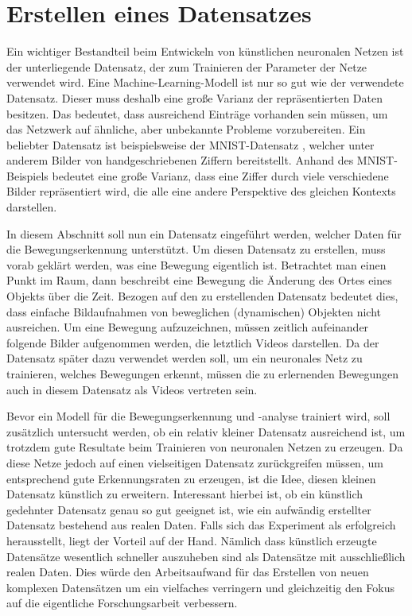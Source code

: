 \chapter{Erstellen eines Datensatzes}\label{chapter:dataset}
Ein wichtiger Bestandteil beim Entwickeln von künstlichen neuronalen Netzen ist
der unterliegende Datensatz, der zum Trainieren der Parameter der Netze
verwendet wird. Eine Machine-Learning-Modell ist nur so gut wie der verwendete
Datensatz. Dieser muss deshalb eine große Varianz der repräsentierten Daten
besitzen. Das bedeutet, dass ausreichend Einträge vorhanden sein müssen, um das
Netzwerk auf ähnliche, aber unbekannte Probleme vorzubereiten. Ein beliebter
Datensatz ist beispielsweise der MNIST-Datensatz \cite{6296535}, welcher unter
anderem Bilder von handgeschriebenen Ziffern bereitstellt. Anhand des
MNIST-Beispiels bedeutet eine große Varianz, dass eine Ziffer durch viele
verschiedene Bilder repräsentiert wird, die alle eine andere Perspektive des
gleichen Kontexts darstellen.

In diesem Abschnitt soll nun ein Datensatz eingeführt werden, welcher Daten für
die Bewegungserkennung unterstützt. Um diesen Datensatz zu erstellen, muss vorab
geklärt werden, was eine Bewegung eigentlich ist. Betrachtet man einen Punkt im
Raum, dann beschreibt eine Bewegung die Änderung des Ortes eines Objekts über
die Zeit. Bezogen auf den zu erstellenden Datensatz bedeutet dies, dass einfache
Bildaufnahmen von beweglichen (dynamischen) Objekten nicht ausreichen. Um eine
Bewegung aufzuzeichnen, müssen zeitlich aufeinander folgende Bilder aufgenommen
werden, die letztlich Videos darstellen. Da der Datensatz später dazu verwendet
werden soll, um ein neuronales Netz zu trainieren, welches Bewegungen erkennt,
müssen die zu erlernenden Bewegungen auch in diesem Datensatz als Videos
vertreten sein.

Bevor ein Modell für die Bewegungserkennung und -analyse trainiert wird, soll
zusätzlich untersucht werden, ob ein relativ kleiner Datensatz ausreichend ist,
um trotzdem gute Resultate beim Trainieren von neuronalen Netzen zu erzeugen. Da
diese Netze jedoch auf einen vielseitigen Datensatz zurückgreifen müssen, um
entsprechend gute Erkennungsraten zu erzeugen, ist die Idee, diesen kleinen
Datensatz künstlich zu erweitern. Interessant hierbei ist, ob ein künstlich
gedehnter Datensatz genau so gut geeignet ist, wie ein aufwändig erstellter
Datensatz bestehend aus realen Daten. Falls sich das Experiment als erfolgreich
herausstellt, liegt der Vorteil auf der Hand. Nämlich dass künstlich erzeugte
Datensätze wesentlich schneller auszuheben sind als Datensätze mit
ausschließlich realen Daten. Dies würde den Arbeitsaufwand für das Erstellen von
neuen komplexen Datensätzen um ein vielfaches verringern und gleichzeitig den
Fokus auf die eigentliche Forschungsarbeit verbessern.

